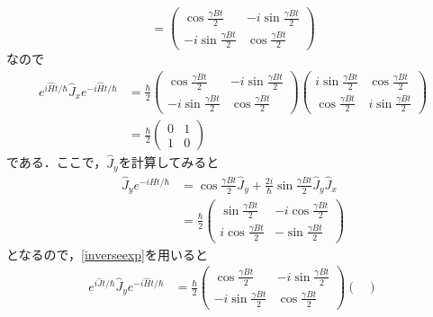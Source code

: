 \documentclass[a4paper,pdflatex,ja=standard]{bxjsarticle}
\begin{document}
\begin{enumerate}
\begin{equation}
    =
    \begin{pmatrix}
      \cos\frac{\gamma Bt}{2} & -i\sin\frac{\gamma Bt}{2} \\
      -i\sin\frac{\gamma Bt}{2} & \cos\frac{\gamma Bt}{2} 
    \end{pmatrix}
    \label{inverseexp}
  \end{equation}
  なので
  \begin{align}
    e^{i\hat{H}t/\hbar}
    \hat{J}_{x}
    e^{-i\hat{H}t/\hbar}
    &=
    \frac{\hbar}{2}
    \begin{pmatrix}
      \cos\frac{\gamma Bt}{2} & -i\sin\frac{\gamma Bt}{2} \\
      -i\sin\frac{\gamma Bt}{2} & \cos\frac{\gamma Bt}{2} 
    \end{pmatrix}
    \begin{pmatrix}
      i\sin\frac{\gamma Bt}{2} & \cos\frac{\gamma Bt}{2} \\
      \cos\frac{\gamma Bt}{2} & i\sin\frac{\gamma Bt}{2}
    \end{pmatrix}
    \nonumber
    \\
    &=
    \frac{\hbar}{2}
    \begin{pmatrix}
      0 & 1 \\
      1 & 0
    \end{pmatrix}
  \end{align}
  である．ここで，$\hat{J}_{y}$を計算してみると
  \begin{align}
    \hat{J}_{y}e^{-i\hat{H}t/\hbar}
    &=
    \cos\frac{\gamma Bt}{2}
    \hat{J}_{y}
    +
    \frac{2i}{\hbar}
    \sin\frac{\gamma Bt}{2}
    \hat{J}_{y}\hat{J}_{x}
    \nonumber
    \\
    &=
    \frac{\hbar}{2}
    \begin{pmatrix}
      \sin\frac{\gamma Bt}{2} & -i\cos\frac{\gamma Bt}{2} \\
      i\cos\frac{\gamma Bt}{2} & -\sin\frac{\gamma Bt}{2}
    \end{pmatrix}
  \end{align}
  となるので，\eqref{inverseexp}を用いると
  \begin{align}
    e^{i\hat{J}t/\hbar}\hat{J}_{y}e^{-i\hat{H}t/\hbar}
    &=
    \frac{\hbar}{2}
    \begin{pmatrix}
      \cos\frac{\gamma Bt}{2} & -i\sin\frac{\gamma Bt}{2} \\
      -i\sin\frac{\gamma Bt}{2} & \cos\frac{\gamma Bt}{2} 
    \end{pmatrix}
    \begin{pmatrix}

\end{pmatrix}
\end{align}
\end{enumerate}
\end{document}
